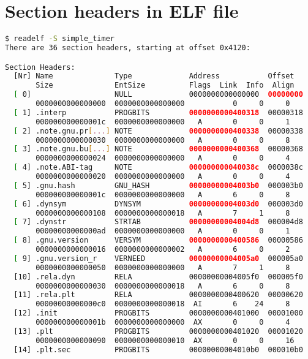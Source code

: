 \section*{Section headers in ELF file} \label{annexsec:readelf_sec_headers}
\begin{lstlisting}[language=bash, caption={List of ELF section headers with readelf tool of a program compiled with GCC.}, label={code:elf_sections}]
$ readelf -S simple_timer
There are 36 section headers, starting at offset 0x4120:

Section Headers:
  [Nr] Name              Type             Address           Offset
       Size              EntSize          Flags  Link  Info  Align
  [ 0]                   NULL             0000000000000000  00000000
       0000000000000000  0000000000000000           0     0     0
  [ 1] .interp           PROGBITS         0000000000400318  00000318
       000000000000001c  0000000000000000   A       0     0     1
  [ 2] .note.gnu.pr[...] NOTE             0000000000400338  00000338
       0000000000000030  0000000000000000   A       0     0     8
  [ 3] .note.gnu.bu[...] NOTE             0000000000400368  00000368
       0000000000000024  0000000000000000   A       0     0     4
  [ 4] .note.ABI-tag     NOTE             000000000040038c  0000038c
       0000000000000020  0000000000000000   A       0     0     4
  [ 5] .gnu.hash         GNU_HASH         00000000004003b0  000003b0
       000000000000001c  0000000000000000   A       6     0     8
  [ 6] .dynsym           DYNSYM           00000000004003d0  000003d0
       0000000000000108  0000000000000018   A       7     1     8
  [ 7] .dynstr           STRTAB           00000000004004d8  000004d8
       00000000000000ad  0000000000000000   A       0     0     1
  [ 8] .gnu.version      VERSYM           0000000000400586  00000586
       0000000000000016  0000000000000002   A       6     0     2
  [ 9] .gnu.version_r    VERNEED          00000000004005a0  000005a0
       0000000000000050  0000000000000000   A       7     1     8
  [10] .rela.dyn         RELA             00000000004005f0  000005f0
       0000000000000030  0000000000000018   A       6     0     8
  [11] .rela.plt         RELA             0000000000400620  00000620
       00000000000000c0  0000000000000018  AI       6    24     8
  [12] .init             PROGBITS         0000000000401000  00001000
       000000000000001b  0000000000000000  AX       0     0     4
  [13] .plt              PROGBITS         0000000000401020  00001020
       0000000000000090  0000000000000010  AX       0     0     16
  [14] .plt.sec          PROGBITS         00000000004010b0  000010b0

\end{lstlisting}
